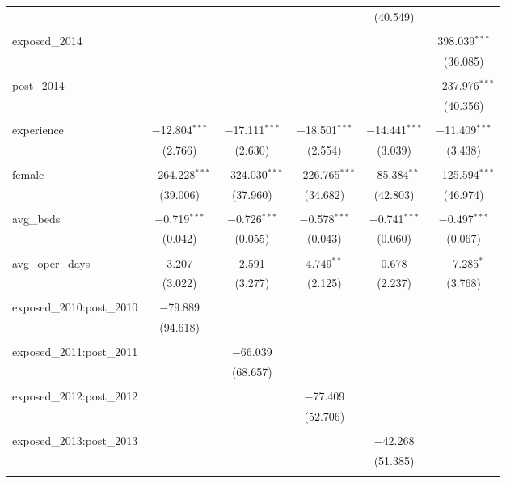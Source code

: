 \begin{table}[!htbp]
\begin{adjustbox}{width=\textwidth}
\begin{tabular}{@{\extracolsep{5pt}}lccccc}
  &  &  &  & (40.549) &  \\ 
  & & & & & \\ 
 exposed\_2014 &  &  &  &  & 398.039$^{***}$ \\ 
  &  &  &  &  & (36.085) \\ 
  & & & & & \\ 
 post\_2014 &  &  &  &  & $-$237.976$^{***}$ \\ 
  &  &  &  &  & (40.356) \\ 
  & & & & & \\ 
 experience & $-$12.804$^{***}$ & $-$17.111$^{***}$ & $-$18.501$^{***}$ & $-$14.441$^{***}$ & $-$11.409$^{***}$ \\ 
  & (2.766) & (2.630) & (2.554) & (3.039) & (3.438) \\ 
  & & & & & \\ 
 female & $-$264.228$^{***}$ & $-$324.030$^{***}$ & $-$226.765$^{***}$ & $-$85.384$^{**}$ & $-$125.594$^{***}$ \\ 
  & (39.006) & (37.960) & (34.682) & (42.803) & (46.974) \\ 
  & & & & & \\ 
 avg\_beds & $-$0.719$^{***}$ & $-$0.726$^{***}$ & $-$0.578$^{***}$ & $-$0.741$^{***}$ & $-$0.497$^{***}$ \\ 
  & (0.042) & (0.055) & (0.043) & (0.060) & (0.067) \\ 
  & & & & & \\ 
 avg\_oper\_days & 3.207 & 2.591 & 4.749$^{**}$ & 0.678 & $-$7.285$^{*}$ \\ 
  & (3.022) & (3.277) & (2.125) & (2.237) & (3.768) \\ 
  & & & & & \\ 
 exposed\_2010:post\_2010 & $-$79.889 &  &  &  &  \\ 
  & (94.618) &  &  &  &  \\ 
  & & & & & \\ 
 exposed\_2011:post\_2011 &  & $-$66.039 &  &  &  \\ 
  &  & (68.657) &  &  &  \\ 
  & & & & & \\ 
 exposed\_2012:post\_2012 &  &  & $-$77.409 &  &  \\ 
  &  &  & (52.706) &  &  \\ 
  & & & & & \\ 
 exposed\_2013:post\_2013 &  &  &  & $-$42.268 &  \\ 
  &  &  &  & (51.385) &  \\ 
  & & & & & \\ 

\end{tabular}
\end{adjustbox}
\end{table}
